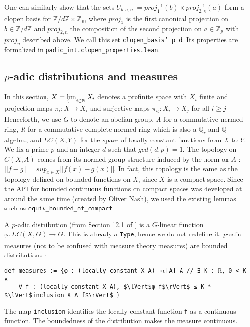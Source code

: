 \documentclass[a4paper,UKenglish,cleveref, autoref, thm-restate]{lipics-v2021}
\newcommand{\lean}[1]{\texttt{#1}\xspace} %
\begin{document}
One can similarly show that the sets $U_{b, a, n} := proj_1^{-1} (b) \times proj_{2,n} ^{-1} (a)$ form a clopen basis for 
$\mathbb{Z} / d \mathbb{Z} \times \mathbb{Z}_p$, where $proj_1$ is the first canonical projection on $b \in \mathbb{Z} / d \mathbb{Z}$ 
and $proj_{2,n}$ the composition of the second projection on $a \in \mathbb{Z}_p$ with $proj_n$ described above. We call this set 
\lean{clopen\_basis' p d}. Its properties are formalized in \href{https://github.com/laughinggas/p-adic-L-functions/blob/main/src/padic_int/clopen_properties.lean}{\lean{padic\_int.clopen\_properties.lean}}.

\subsection{$p$-adic distributions and measures}
In this section, $X = \varprojlim_{i \in \mathbb{N}} X_i$ denotes a profinite space with $X_i$ finite and
projection maps $\pi_i : X \xrightarrow[]{} X_i$ and surjective maps
$\pi_{ij} : X_i \xrightarrow[]{} X_j$ for all $i \ge j$. Henceforth, we use $G$ to denote an abelian group,
$A$ for a commutative normed ring, $R$ for a commutative complete normed ring which is also a $\mathbb{Q}_p$ and $\mathbb{Q}$-algebra, 
and $LC(X,Y)$ for the space of locally constant functions from $X$ to $Y$. 
We fix a prime $p$ and an integer $d$ such that $gcd(d, p) =1$. \newline
The topology on $C(X, A)$ comes from its normed group structure induced by the norm on $A$ :
$|| f - g || = sup_{x \in X} || f(x) - g(x) ||$. In fact, this topology is the same as the 
topology defined on bounded functions on $X$, since $X$ is a compact space. Since the API for bounded 
continuous functions on compact spaces was developed at around the same time (created by Oliver Nash), 
we used the existing lemmas such as 
\href{https://github.com/leanprover-community/mathlib/blob/32253a1a1071173b33dc7d6a218cf722c6feb514/src/topology/continuous_function/compact.lean#L47}{\lean{equiv\_bounded\_of\_compact}}.

A $p$-adic distribution (from Section 12.1 of \cite{cyc}) is a $G$-linear function $\phi : LC(X, G) \xrightarrow[]{} G$. 
This is already a \lean{Type}, hence we do not redefine it. 
$p$-adic measures (not to be confused with measure theory measures) are bounded distributions :
\begin{lstlisting}
def measures := {φ : (locally_constant X A) →ₗ[A] A // ∃ K : ℝ, 0 < K ∧ 
    ∀ f : (locally_constant X A), $\lVert$φ f$\rVert$ ≤ K * $\lVert$inclusion X A f$\rVert$ }
\end{lstlisting}
The map \lean{inclusion} identifies the locally constant function \lean{f} as a continuous function. 
The boundedness of the distribution makes the measure continuous.
\end{document}
